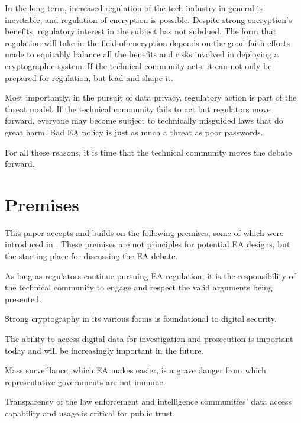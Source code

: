 In the long term, increased regulation of the tech industry in general is inevitable, and regulation of encryption is
possible. Despite strong encryption's benefits, regulatory interest in the subject has not subdued. The form that
regulation will take in the field of encryption depends on the good faith efforts made to equitably balance all the
benefits and risks involved in deploying a cryptographic system. If the technical community acts, it can not only be
prepared for regulation, but lead and shape it.

Most importantly, in the pursuit of data privacy, regulatory action is part of the threat model. If the technical
community fails to act but regulators move forward, everyone may become subject to technically misguided laws that do
great harm. Bad \ac{EA} policy is just as much a threat as poor passwords.

For all these reasons, it is time that the technical community moves the debate forward.


\section{Premises}
\label{sec-premises}

This paper accepts and builds on the following premises, some of which were introduced in . These
premises are not principles for potential \ac{EA} designs, but the starting place for discussing the \ac{EA} debate.

\eestart

 As long as regulators continue pursuing \ac{EA} regulation, it is the responsibility of
the technical community to engage and respect the valid arguments being presented.

 Strong cryptography in its various forms is foundational to digital security.

 The ability to access digital data for investigation and prosecution is important today and
will be increasingly important in the future.

 Mass surveillance, which \ac{EA} makes easier, is a grave danger from which
representative governments are not immune.

 Transparency of the law enforcement and intelligence communities' data access capability
and usage is critical for public trust.

